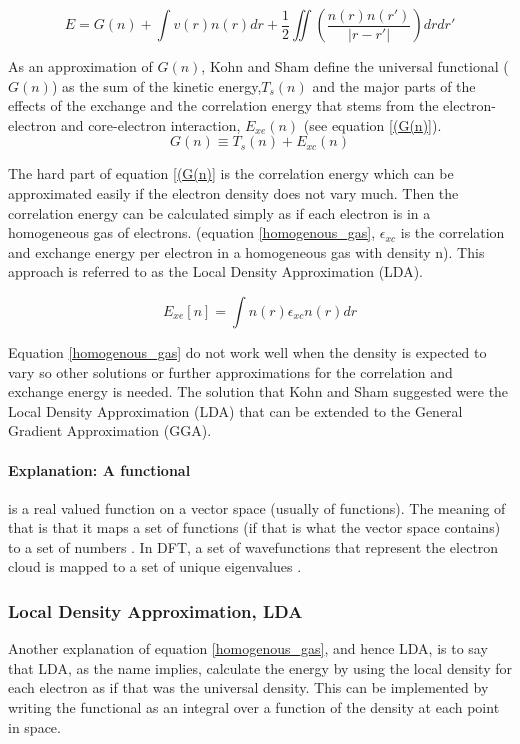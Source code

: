 \documentclass[10pt,a4paper]{article}
\begin{document}
\begin{equation} \label{Kohn_hohenberg}
E = G(n) + \int v(r) n(r) dr + \frac{1}{2} \iint (\frac{n(r) n(r')}{|r-r'|})dr dr'
\end{equation}

As an approximation of $G(n)$, Kohn and Sham define the universal functional ($G(n)$) as the sum of the kinetic energy,$T_s(n)$ and the major parts of the effects of the exchange and the correlation energy that stems from the electron-electron and core-electron interaction, $E_{xe}(n)$ (see equation \ref{(G(n)}).
\begin{equation} \label{(G(n)}
G(n) \equiv T_s(n) + E_{xc}(n)
\end{equation}


The hard part of equation \ref{(G(n)} is the correlation energy which can be approximated easily if the electron density does not vary much. Then the correlation energy can be calculated simply as if each electron is in a homogeneous gas of electrons. (equation \ref{homogenous_gas}, $\epsilon_{xc}$ is the correlation and exchange energy per electron in a homogeneous gas with density n). This approach is referred to as the Local Density Approximation (LDA).

\begin{equation} \label{homogenous_gas}
E_{xe}[n] = \int n(r)\epsilon_{xc} n(r) dr 
\end{equation}

Equation \ref{homogenous_gas} do not work well when the density is expected to vary so other solutions or further approximations for the correlation and exchange energy is needed. The solution that Kohn and Sham suggested were the Local Density Approximation (LDA) that can be extended to the General Gradient Approximation (GGA).
\cite{Kohn_and_Hohenberg64}\cite{Kohn_and_Sham65}

\paragraph{Explanation: A functional} is a real valued function on a vector space (usually of functions). The meaning of that is that it maps a set of functions (if that is what the vector space contains) to a set of numbers \cite{functional}. In DFT, a set of wavefunctions that represent the electron cloud is mapped to a set of unique eigenvalues \cite{burke} .




\subsubsection{Local Density Approximation, LDA}
Another explanation of equation \ref{homogenous_gas}, and hence LDA, is to say that LDA, as the name implies, calculate the energy by using the local density for each electron as if that was the universal density. This can be implemented by writing the functional as an integral over a function of the density at each point in space.
\end{document}
